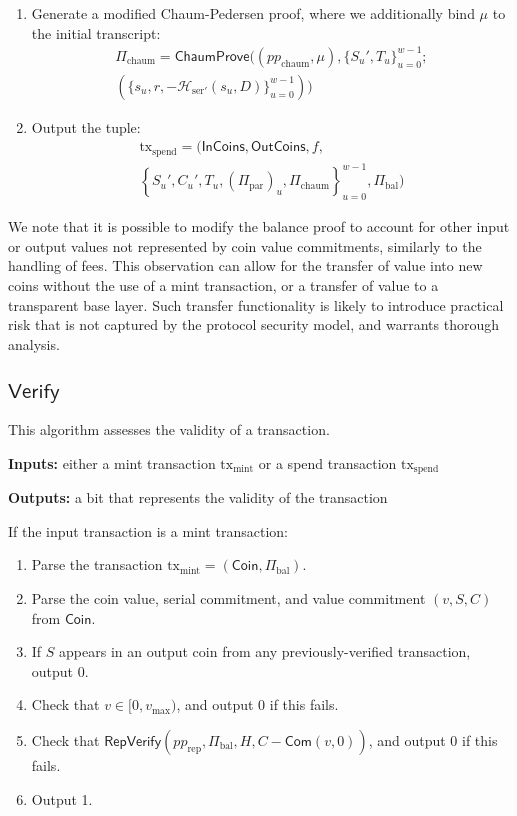 \documentclass{llncs}
\newcommand{\hash}{\mathcal{H}}
\newcommand{\func}[1]{\mathsf{#1}}
\newcommand{\com}{\func{Com}}
\begin{document}
\begin{enumerate}
    \item Generate a modified Chaum-Pedersen proof, where we additionally bind $\mu$ to the initial transcript:
    \begin{multline*}
    \Pi_{\text{chaum}} = \func{ChaumProve}((pp_{\text{chaum}}, \mu), \{S_u', T_u\}_{u=0}^{w-1}; \\
    (\{s_u, r, -\hash_{\text{ser}'}(s_u, D)\}_{u=0}^{w-1}))
    \end{multline*}
    \item Output the tuple:
    \begin{multline*}
    \text{tx}_{\text{spend}} = ( \func{InCoins}, \func{OutCoins}, f, \\
    \left\{ S_u', C_u', T_u, (\Pi_{\text{par}})_u, \Pi_{\text{chaum}} \right\}_{u=0}^{w-1}, \Pi_{\text{bal}} )
    \end{multline*}
\end{enumerate}

\begin{remark}
We note that it is possible to modify the balance proof to account for other input or output values not represented by coin value commitments, similarly to the handling of fees.
This observation can allow for the transfer of value into new coins without the use of a mint transaction, or a transfer of value to a transparent base layer.
Such transfer functionality is likely to introduce practical risk that is not captured by the protocol security model, and warrants thorough analysis.
\end{remark}


\subsection{\texorpdfstring{$\func{Verify}$}{Verify}}

This algorithm assesses the validity of a transaction.

\textbf{Inputs:} either a mint transaction $\text{tx}_{\text{mint}}$ or a spend transaction $\text{tx}_{\text{spend}}$

\textbf{Outputs:} a bit that represents the validity of the transaction

If the input transaction is a mint transaction:
\begin{enumerate}
    \item Parse the transaction $\text{tx}_{\text{mint}} = (\func{Coin}, \Pi_{\text{bal}})$.
    \item Parse the coin value, serial commitment, and value commitment $(v,S,C)$ from $\func{Coin}$.
    \item If $S$ appears in an output coin from any previously-verified transaction, output 0.
    \item Check that $v \in [0,v_{\text{max}})$, and output 0 if this fails.
    \item Check that $\func{RepVerify}(pp_{\text{rep}},\Pi_{\text{bal}},H,C - \com(v,0))$, and output 0 if this fails.
    \item Output 1.
\end{enumerate}
\end{document}
